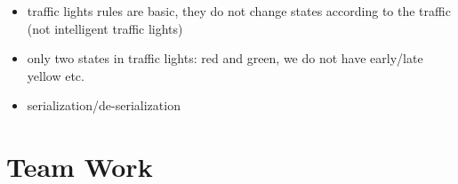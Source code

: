 \begin{itemize}
        \item traffic lights rules are basic, they do not change states according to the traffic (not intelligent traffic lights)
        \item only two states in traffic lights: red and green, we do not have early/late yellow etc.
\end{itemize}
     
\begin{itemize}
	\item serialization/de-serialization
\end{itemize}

\section{Team Work}

